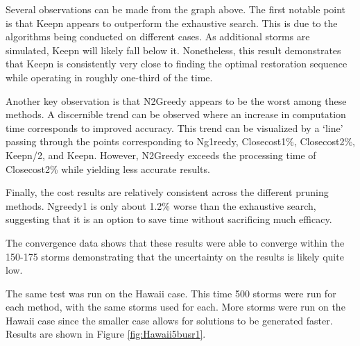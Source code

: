 \documentclass[12pt]{article}
\begin{document}
Several observations can be made from the graph above. The first notable point is that Keepn appears to outperform the exhaustive search. This is due to the algorithms being conducted on different cases. As additional storms are simulated, Keepn will likely fall below it. Nonetheless, this result demonstrates that Keepn is consistently very close to finding the optimal restoration sequence while operating in roughly one-third of the time. \par
Another key observation is that N2Greedy appears to be the worst among these methods. A discernible trend can be observed where an increase in computation time corresponds to improved accuracy. This trend can be visualized by a `line' passing through the points corresponding to Ng1reedy, Closecost1\%, Closecost2\%, Keepn/2, and Keepn. However, N2Greedy exceeds the processing time of Closecost2\% while yielding less accurate results. \par
Finally, the cost results are relatively consistent across the different pruning methods. Ngreedy1 is only about 1.2\% worse than the exhaustive search, suggesting that it is an option to save time without sacrificing much efficacy. \par

The convergence data shows that these results were able to converge within the 150-175 storms demonstrating that the uncertainty on the results is likely quite low.\par

The same test was run on the Hawaii case. This time 500 storms were run for each method, with the same storms used for each. More storms were run on the Hawaii case since the smaller case allows for solutions to be generated faster. Results are shown in Figure \ref{fig:Hawaii5busr1}.
\end{document}
